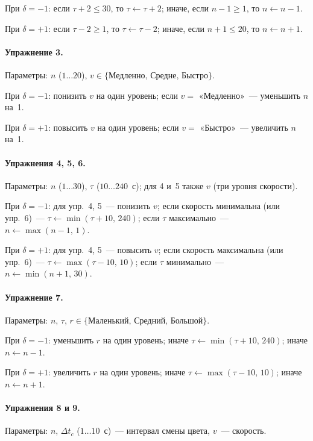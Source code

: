 При $\delta = -1$: если $\tau + 2 \leq 30$, то $\tau \leftarrow \tau + 2$;
иначе, если $n - 1 \geq 1$, то $n \leftarrow n - 1$.

При $\delta = +1$: если $\tau - 2 \geq 1$, то $\tau \leftarrow \tau - 2$;
иначе, если $n + 1 \leq 20$, то $n \leftarrow n + 1$.

\paragraph{Упражнение 3.}
Параметры: $n$ ($1 \ldots 20$), $v \in \{\text{Медленно},\,
\text{Средне},\,\text{Быстро}\}$.

При $\delta = -1$: понизить $v$ на один уровень; если $v =$ «Медленно»~---
уменьшить $n$ на~1.

При $\delta = +1$: повысить $v$ на один уровень; если $v =$ «Быстро»~---
увеличить $n$ на~1.

\paragraph{Упражнения 4, 5, 6.}
Параметры: $n$ ($1 \ldots 30$), $\tau$ ($10 \ldots 240$~с);
для 4 и~5 также $v$ (три уровня скорости).

При $\delta = -1$: для упр.~4, 5~--- понизить $v$; если скорость
минимальна (или упр.~6)~--- $\tau \leftarrow \min(\tau + 10,\, 240)$;
если $\tau$ максимально~--- $n \leftarrow \max(n - 1,\, 1)$.

При $\delta = +1$: для упр.~4, 5~--- повысить $v$; если скорость
максимальна (или упр.~6)~--- $\tau \leftarrow \max(\tau - 10,\, 10)$;
если $\tau$ минимально~--- $n \leftarrow \min(n + 1,\, 30)$.

\paragraph{Упражнение 7.}
Параметры: $n$, $\tau$, $r \in \{\text{Маленький},\,\text{Средний},\,
\text{Большой}\}$.

При $\delta = -1$: уменьшить $r$ на один уровень; иначе
$\tau \leftarrow \min(\tau + 10,\, 240)$; иначе $n \leftarrow n - 1$.

При $\delta = +1$: увеличить $r$ на один уровень; иначе
$\tau \leftarrow \max(\tau - 10,\, 10)$; иначе $n \leftarrow n + 1$.

\paragraph{Упражнения 8 и 9.}
Параметры: $n$, $\Delta t_c$ ($1 \ldots 10$~с)~--- интервал смены цвета,
$v$~--- скорость.

